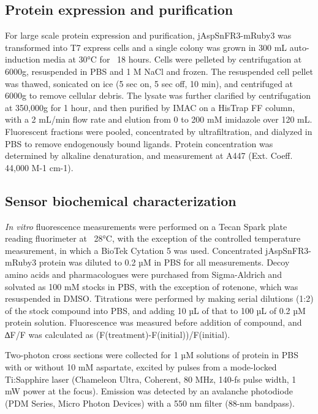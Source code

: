 \documentclass[9pt,lineno]{elife}
\begin{document}
\subsection{Protein expression and purification}
For large scale protein expression and purification, jAspSnFR3-mRuby3 was transformed into T7 express cells and a single colony was grown in 300 mL auto-induction media \citep{Studier2005-ki} at 30°C for ~18 hours.
Cells were pelleted by centrifugation at 6000g, resuspended in PBS and 1 M NaCl and frozen.
The resuspended cell pellet was thawed, sonicated on ice (5 sec on, 5 sec off, 10 min), and centrifuged at 6000g to remove cellular debris.
The lysate was further clarified by centrifugation at 350,000g for 1 hour, and then purified by IMAC on a HisTrap FF column, with a 2 mL/min flow rate and elution from 0 to 200 mM imidazole over 120 mL.
Fluorescent fractions were pooled, concentrated by ultrafiltration, and dialyzed in PBS to remove endogenously bound ligands.
Protein concentration was determined by alkaline denaturation, and measurement at A447 (Ext. Coeff. 44,000 M-1 cm-1).

\subsection{Sensor biochemical characterization}
\textit{In vitro} fluorescence measurements were performed on a Tecan Spark plate reading fluorimeter at ~28°C, with the exception of the controlled temperature measurement, in which a BioTek Cytation 5 was used.
Concentrated jAspSnFR3-mRuby3 protein was diluted to 0.2 µM in PBS for all measurements.
Decoy amino acids and pharmacologues were purchased from Sigma-Aldrich and solvated as 100 mM stocks in PBS, with the exception of rotenone, which was resuspended in DMSO.
Titrations were performed by making serial dilutions (1:2) of the stock compound into PBS, and adding 10 µL of that to 100 µL of 0.2 µM protein solution.
Fluorescence was measured before addition of compound, and ∆F/F was calculated as (F(treatment)-F(initial))/F(initial).

Two-photon cross sections were collected for 1 µM solutions of protein in PBS with or without 10 mM aspartate, excited by pulses from a mode-locked Ti:Sapphire laser (Chameleon Ultra, Coherent, 80 MHz, 140-fs pulse width, 1 mW power at the focus).
Emission was detected by an avalanche photodiode (PDM Series, Micro Photon Devices) with a 550 nm filter (88-nm bandpass).
\end{document}
